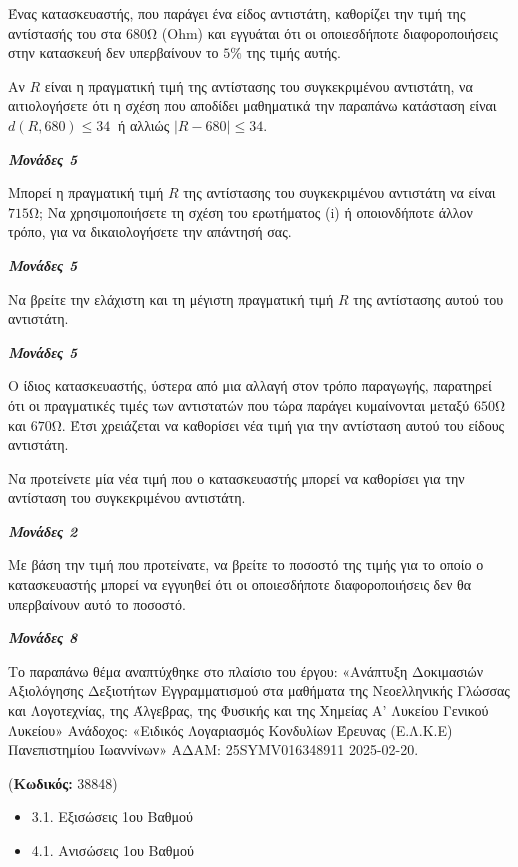 \documentclass[11pt,a4paper,twoside]{book}
\newcounter{askhsh}[chapter]
\renewcommand{\theaskhsh}{
	\bf{\titlefont{\Large{\thechapter}}.\arabic{askhsh}}
}
\newcommand{\Askhsh}[2]{\refstepcounter{askhsh}{\titlefont{Άσκηση\theaskhsh} - \textcolor{maincolor}{ΘΕΜΑ #2}} ({\small{\textbf{Κωδικός:} #1}})\\}{}
\newenvironment{ylh}{
\begin{tcolorbox}[
breakable,
enhanced standard,
titlerule=0pt,
toprule=0pt, 
rightrule=0pt, 
bottomrule=0pt,
title={\titlefont Ύλη άσκησης},
colback=white,
opacityback=0,
left=2mm,
top=1mm,
bottom=0mm,
boxrule=0pt,
colframe=white,
borderline west={1.5mm}{0pt}{secondarycolor},
leftrule=2mm,
sharp corners,
coltitle=black
]
\begin{itemize}[leftmargin=3mm, itemsep=0mm, label=\textcolor{secondarycolor}{{\small\faBook}}]
}{
\end{itemize}
\end{tcolorbox}
}
\newcommand{\monades}[1]{
\hspace*{\fill}
\textbf{\textit{\textcolor{maincolor}{Μονάδες #1}}}}
\begin{document}
\begin{alist}
\item Ένας κατασκευαστής, που παράγει ένα είδος αντιστάτη, καθορίζει την τιμή της αντίστασής του στα $680$Ω (Ohm) και εγγυάται ότι οι οποιεσδήποτε διαφοροποιήσεις στην κατασκευή δεν υπερβαίνουν το $5\%$ της τιμής αυτής.

\begin{rlist}
\item Αν $R$ είναι η πραγματική τιμή της αντίστασης του συγκεκριμένου αντιστάτη, να αιτιολογήσετε ότι η σχέση που αποδίδει μαθηματικά την παραπάνω κατάσταση είναι $d(R,680) \leq 34\ $ ή αλλιώς $|R - 680| \leq 34$.
\monades{5}
\item Μπορεί η πραγματική τιμή $R$ της αντίστασης του συγκεκριμένου αντιστάτη να είναι $715$Ω; Να χρησιμοποιήσετε τη σχέση του ερωτήματος (i) ή οποιονδήποτε άλλον τρόπο, για να δικαιολογήσετε την απάντησή σας.
\monades{5}
\item Να βρείτε την ελάχιστη και τη μέγιστη πραγματική τιμή $R$ της αντίστασης αυτού του αντιστάτη.
\monades{5}
\end{rlist}
\item Ο ίδιος κατασκευαστής, ύστερα από μια αλλαγή στον τρόπο παραγωγής, παρατηρεί ότι οι πραγματικές τιμές των αντιστατών που τώρα παράγει κυμαίνονται μεταξύ $650$Ω και $670$Ω. Έτσι χρειάζεται να καθορίσει νέα τιμή για την αντίσταση αυτού του είδους αντιστάτη.

\begin{rlist}
\item Να προτείνετε μία νέα τιμή που ο κατασκευαστής μπορεί να καθορίσει για την αντίσταση του συγκεκριμένου αντιστάτη.
\monades{2}
\item Με βάση την τιμή που προτείνατε, να βρείτε το ποσοστό της τιμής για το οποίο ο κατασκευαστής μπορεί να εγγυηθεί ότι οι οποιεσδήποτε διαφοροποιήσεις δεν θα υπερβαίνουν αυτό το ποσοστό.
\monades{8}

{\footnotesize Το παραπάνω θέμα αναπτύχθηκε στο πλαίσιο του έργου: «Ανάπτυξη Δοκιμασιών Αξιολόγησης Δεξιοτήτων Εγγραμματισμού στα μαθήματα της Νεοελληνικής Γλώσσας και Λογοτεχνίας, της Άλγεβρας, της Φυσικής και της Χημείας Α' Λυκείου Γενικού Λυκείου» Ανάδοχος: «Ειδικός Λογαριασμός Κονδυλίων Έρευνας (Ε.Λ.Κ.Ε) Πανεπιστημίου Ιωαννίνων» ΑΔΑΜ: 25SYMV016348911 2025-02-20.}
\end{rlist}
\end{alist}

\vspace{4mm}
\Askhsh{38848}{4}
\begin{ylh}
    \item 3.1. Εξισώσεις 1ου Βαθμού
    \item 4.1. Ανισώσεις 1ου Βαθμού
\end{ylh}
\end{document}
